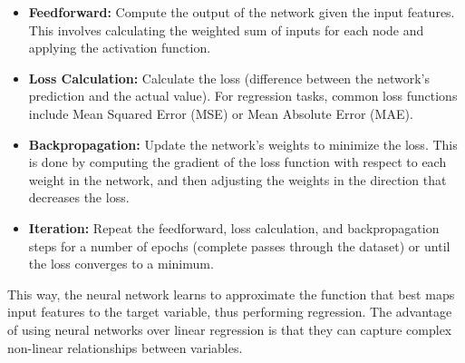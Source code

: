 \begin{itemize}
\item \textbf{Feedforward:} Compute the output of the network given the input features. This involves calculating the weighted sum of inputs for each node and applying the activation function.

\item \textbf{Loss Calculation:} Calculate the loss (difference between the network's prediction and the actual value). For regression tasks, common loss functions include Mean Squared Error (MSE) or Mean Absolute Error (MAE).

\item \textbf{Backpropagation:} Update the network's weights to minimize the loss. This is done by computing the gradient of the loss function with respect to each weight in the network, and then adjusting the weights in the direction that decreases the loss.

\item \textbf{Iteration:} Repeat the feedforward, loss calculation, and backpropagation steps for a number of epochs (complete passes through the dataset) or until the loss converges to a minimum.

\end{itemize}

This way, the neural network learns to approximate the function that best maps input features to the target variable, thus performing regression. The advantage of using neural networks over linear regression is that they can capture complex non-linear relationships between variables.